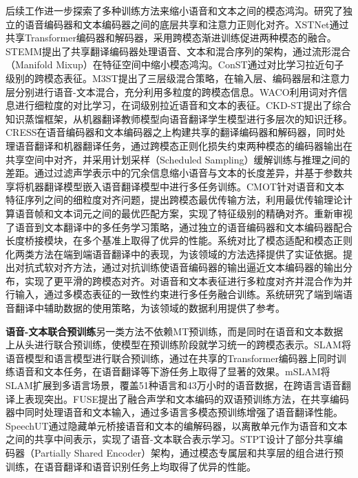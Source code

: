 后续工作进一步探索了多种训练方法来缩小语音和文本之间的模态鸿沟。\citet{tang-etal-2021-improving}研究了独立的语音编码器和文本编码器之间的底层共享和注意力正则化对齐。XSTNet\citep{ye2021xstnet}通过共享Transformer编码器和解码器，采用跨模态渐进训练促进两种模态的融合。STEMM\citep{fang-etal-2022-STEMM}提出了共享翻译编码器处理语音、文本和混合序列的架构，通过流形混合（Manifold Mixup）在特征空间中缩小模态鸿沟。ConST\citep{ye-etal-2022-cross}通过对比学习拉近句子级别的跨模态表征。M3ST\citep{cheng2023m3st}提出了三层级混合策略，在输入层、编码器层和注意力层分别进行语音-文本混合，充分利用多粒度的跨模态信息。WACO\citep{ouyang-etal-2023-waco}利用词对齐信息进行细粒度的对比学习，在词级别拉近语音和文本的表征。CKD-ST\citep{lei-etal-2023-ckdst}提出了综合知识蒸馏框架，从机器翻译教师模型向语音翻译学生模型进行多层次的知识迁移。CRESS\citep{fang-and-feng-2023-understanding}在语音编码器和文本编码器之上构建共享的翻译编码器和解码器，同时处理语音翻译和机器翻译任务，通过跨模态正则化损失约束两种模态的编码器输出在共享空间中对齐，并采用计划采样（Scheduled Sampling）缓解训练与推理之间的差距。\citet{liu2023crossmodal}通过过滤声学表示中的冗余信息缩小语音与文本的长度差异，并基于参数共享将机器翻译模型嵌入语音翻译模型中进行多任务训练。CMOT\citep{zhou-etal-2023-cmot}针对语音和文本特征序列之间的细粒度对齐问题，提出跨模态最优传输方法，利用最优传输理论计算语音帧和文本词元之间的最优匹配方案，实现了特征级别的精确对齐。\citet{zhang2023rethinking}重新审视了语音到文本翻译中的多任务学习策略，通过独立的语音编码器和文本编码器配合长度桥接模块，在多个基准上取得了优异的性能。\citet{han2023tab}系统对比了模态适配和模态正则化两类方法在端到端语音翻译中的表现，为该领域的方法选择提供了实证依据。\citet{zhang2024salign}提出对抗式软对齐方法，通过对抗训练使语音编码器的输出逼近文本编码器的输出分布，实现了更平滑的跨模态对齐。\citet{zhou2025crossmodal}对语音和文本表征进行多粒度对齐并混合作为并行输入，通过多模态表征的一致性约束进行多任务融合训练。\citet{liu2025auxiliary}系统研究了端到端语音翻译中辅助数据的使用策略，为该领域的数据利用提供了参考。

\textbf{语音-文本联合预训练}\quad 另一类方法不依赖MT预训练，而是同时在语音和文本数据上从头进行联合预训练，使模型在预训练阶段就学习统一的跨模态表示。SLAM\citep{slam}将语音模型和语言模型进行联合预训练，通过在共享的Transformer编码器上同时训练语音和文本任务，在语音翻译等下游任务上取得了显著的效果。mSLAM\citep{mSLAM}将SLAM扩展到多语言场景，覆盖51种语言和43万小时的语音数据，在跨语言语音翻译上表现突出。FUSE\citep{zheng2021fused}提出了融合声学和文本编码的双语预训练方法，在共享编码器中同时处理语音和文本输入，通过多语言多模态预训练增强了语音翻译性能。SpeechUT\citep{zhang2022speechut}通过隐藏单元桥接语音和文本的编解码器，以离散单元作为语音和文本之间的共享中间表示，实现了语音-文本联合表示学习。STPT\citep{tang-etal-2022-unified}设计了部分共享编码器（Partially Shared Encoder）架构，通过模态专属层和共享层的组合进行预训练，在语音翻译和语音识别任务上均取得了优异的性能。


